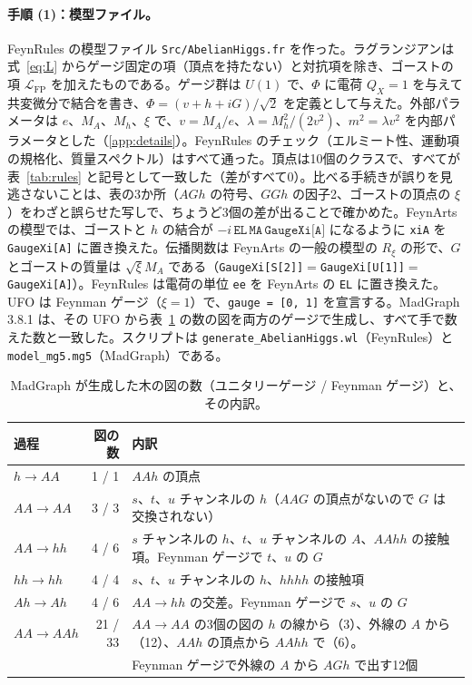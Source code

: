 \documentclass[a4paper,10pt]{ltjsarticle}
\begin{document}
\paragraph{手順 (1)：模型ファイル。}FeynRules の模型ファイル \texttt{Src/AbelianHiggs.fr} を作った。ラグランジアンは式~\eqref{eq:L} からゲージ固定の項（頂点を持たない）と対抗項を除き、ゴーストの項 $\mathcal L_{\mathrm{FP}}$ を加えたものである。ゲージ群は $U(1)$ で、$\Phi$ に電荷 $Q_X=1$ を与えて共変微分で結合を書き、$\Phi=(v+h+iG)/\sqrt2$ を定義として与えた。外部パラメータは $e$、$M_A$、$M_h$、$\xi$ で、$v=M_A/e$、$\lambda=M_h^2/(2v^2)$、$m^2=\lambda v^2$ を内部パラメータとした（\ref{app:details}）。FeynRules のチェック（エルミート性、運動項の規格化、質量スペクトル）はすべて通った。頂点は10個のクラスで、すべてが表~\ref{tab:rules} と記号として一致した（差がすべて0）。比べる手続きが誤りを見逃さないことは、表の3か所（$AGh$ の符号、$GGh$ の因子2、ゴーストの頂点の $\xi$）をわざと誤らせた写しで、ちょうど3個の差が出ることで確かめた。FeynArts の模型では、ゴーストと $h$ の結合が $-i\,\texttt{EL}\,\texttt{MA}\,\texttt{GaugeXi[A]}$ になるように \texttt{xiA} を \texttt{GaugeXi[A]} に置き換えた。伝播関数は FeynArts の一般の模型の $R_\xi$ の形で、$G$ とゴーストの質量は $\sqrt{\xi}M_A$ である（\texttt{GaugeXi[S[2]]}$=$\texttt{GaugeXi[U[1]]}$=$\texttt{GaugeXi[A]}）。FeynRules は電荷の単位 \texttt{ee} を FeynArts の \texttt{EL} に置き換えた。UFO は Feynman ゲージ（$\xi=1$）で、\texttt{gauge = [0, 1]} を宣言する。MadGraph 3.8.1 は、その UFO から表~\ref{tab:diagrams} の数の図を両方のゲージで生成し、すべて手で数えた数と一致した。スクリプトは \texttt{generate\_AbelianHiggs.wl}（FeynRules）と \texttt{model\_mg5.mg5}（MadGraph）である。

\begin{table}[tbp]
\centering\small
\caption{MadGraph が生成した木の図の数（ユニタリーゲージ / Feynman ゲージ）と、その内訳。}
\label{tab:diagrams}
\begin{tabularx}{\linewidth}{lr>{\raggedright\arraybackslash}X}
\toprule
過程 & 図の数 & 内訳 \\
\midrule
$h\to AA$ & 1 / 1 & $AAh$ の頂点 \\
$AA\to AA$ & 3 / 3 & $s$、$t$、$u$ チャンネルの $h$（$AAG$ の頂点がないので $G$ は交換されない） \\
$AA\to hh$ & 4 / 6 & $s$ チャンネルの $h$、$t$、$u$ チャンネルの $A$、$AAhh$ の接触項。Feynman ゲージで $t$、$u$ の $G$ \\
$hh\to hh$ & 4 / 4 & $s$、$t$、$u$ チャンネルの $h$、$hhhh$ の接触項 \\
$Ah\to Ah$ & 4 / 6 & $AA\to hh$ の交差。Feynman ゲージで $s$、$u$ の $G$ \\
$AA\to AAh$ & 21 / 33 & $AA\to AA$ の3個の図の $h$ の線から（3）、外線の $A$ から（12）、$AAh$ の頂点から $AAhh$ で（6）。\\
& & Feynman ゲージで外線の $A$ から $AGh$ で出す12個 \\
\bottomrule
\end{tabularx}
\end{table}
\end{document}
